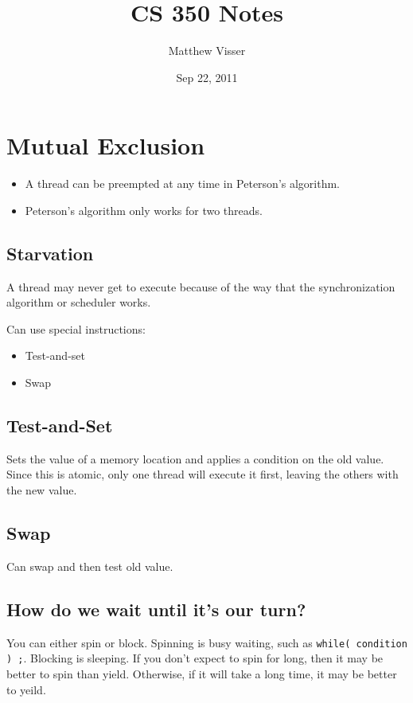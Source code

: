 \documentclass[12pt]{article}
\begin{document}
\title{CS 350 Notes}
\author{Matthew Visser}
\date{Sep 22, 2011}
\maketitle

\section{Mutual Exclusion}

\begin{itemize}
    \item A thread can be preempted at any time in Peterson's algorithm.
    \item Peterson's algorithm only works for two threads. 
\end{itemize}

\subsection{Starvation}

A thread may never get to execute because of the way that the synchronization
algorithm or scheduler works.

Can use special instructions:
\begin{itemize}
    \item Test-and-set
    \item Swap
\end{itemize}

\subsection{Test-and-Set}

Sets the value of a memory location and applies a condition on the old value.
Since this is atomic, only one thread will execute it first, leaving the others
with the new value.

\subsection{Swap}

Can swap and then test old value.

\subsection{How do we wait until it's our turn?}

You can either spin or block. Spinning is busy waiting, such as
\texttt{while( condition ) ;}. Blocking is sleeping. If you don't expect to spin
for long, then it may be better to spin than yield. Otherwise, if it will take a
long time, it may be better to yeild.
\end{document}

